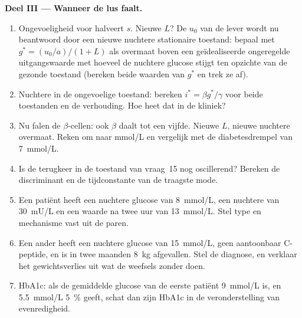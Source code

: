 \begin{problem}
\medskip
\noindent\textbf{Deel III --- Wanneer de lus faalt.}
\begin{enumerate}[resume]
  \item Ongevoeligheid voor  halveert $s$. Nieuwe $L$? De
        $u_{0}$ van de lever wordt nu beantwoord door een nieuwe
        nuchtere stationaire toestand: bepaal met $g^{*} = (u_{0}/a)/(1
        + L)$ als overmaat boven een geïdealiseerde ongeregelde
        uitgangswaarde met hoeveel de nuchtere glucose stijgt ten
        opzichte van de gezonde toestand (bereken beide waarden van
        $g^{*}$ en trek ze af).
  \item Nuchtere  in de ongevoelige toestand: bereken $i^{*} = \beta
        g^{*}/\gamma$ voor beide toestanden en de verhouding. Hoe heet
        dat in de kliniek?
  \item Nu falen de $\beta$-cellen: ook $\beta$ daalt tot een vijfde.
        Nieuwe $L$, nieuwe nuchtere overmaat. Reken om naar mmol/L en
        vergelijk met de diabetesdrempel van \qty{7}{mmol/L}.
  \item Is de terugkeer in de toestand van vraag~15 nog oscillerend?
        Bereken de discriminant en de tijdconstante van de traagste
        mode.
  \item Een patiënt heeft een nuchtere glucose van \qty{8}{mmol/L}, een
        nuchtere  van \qty{30}{mU/L} en een waarde na twee uur
        van \qty{13}{mmol/L}. Stel type en mechanisme vast uit de paren.
  \item Een ander heeft een nuchtere glucose van \qty{15}{mmol/L}, geen
        aantoonbaar C-peptide, en is in twee maanden \qty{8}{kg}
        afgevallen. Stel de diagnose, en verklaar het gewichtsverlies
        uit wat de weefsels zonder  doen.
  \item HbA1c: als de gemiddelde glucose van de eerste patiënt
        \qty{9}{mmol/L} is, en \qty{5.5}{mmol/L} \qty{5}{\%} geeft,
        schat dan zijn HbA1c in de veronderstelling van evenredigheid.
\end{enumerate}


\end{problem}
